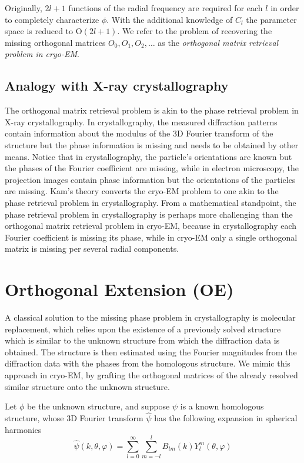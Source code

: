 Originally, $2l+1$ functions of
the radial frequency are required for each $l$ in order
to completely characterize $\phi$. With the additional knowledge of
$C_l$ the parameter space is reduced
to $\text{O}(2l+1)$. We refer to the problem of recovering the missing orthogonal matrices $O_0,O_1,O_2,\ldots$ as the {\em orthogonal matrix retrieval problem in cryo-EM}.  

\subsection{Analogy with X-ray crystallography}
The orthogonal matrix retrieval problem is akin to the phase retrieval problem in X-ray crystallography. In crystallography,  
the measured diffraction patterns contain information about the modulus of the 3D
Fourier transform of the structure but the phase information is missing and needs to be obtained by other means. Notice that in crystallography,
the particle's orientations are known but
the phases of the Fourier coefficient are missing, while in electron
microscopy, the projection images contain phase information but the orientations of the
particles are missing. Kam's theory converts the cryo-EM problem to one akin to the phase retrieval problem in crystallography. From a mathematical standpoint, the phase retrieval problem in crystallography is perhaps more challenging than the orthogonal matrix retrieval problem in cryo-EM, because in crystallography each Fourier coefficient is missing its phase, while in cryo-EM only a single orthogonal matrix is missing per several radial components.

\section{Orthogonal Extension (OE)}
A classical solution to the missing phase problem in crystallography is
molecular replacement, which relies upon the existence of a previously solved structure which is similar to the unknown structure from which the
diffraction data is obtained. The structure is then estimated using the Fourier magnitudes from the diffraction data with the phases from the homologous structure. We mimic this approach in cryo-EM, by grafting the
orthogonal matrices of the already resolved
similar structure onto the unknown structure. 

Let $\phi$ be the unknown structure, and suppose $\psi$ is a known homologous structure, whose 3D Fourier transform $\hat{\psi}$ has the following expansion in spherical harmonics 
\begin{equation}
\hat{\psi}(k,\theta,\varphi) = \sum_{l=0}^{\infty} \sum_{m=-l}^{l}
B_{lm}(k) Y_l^m (\theta, \varphi)
\end{equation} 

